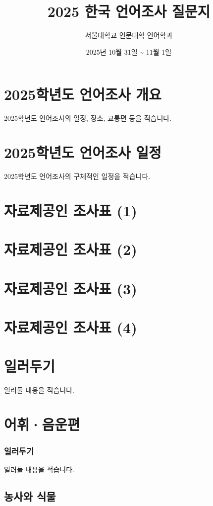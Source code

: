 \documentclass{snu-fl-questionnaire}
\title{2025 한국 언어조사 질문지}
\author{서울대학교 인문대학 언어학과}
\date{2025년 10월 31일 \textasciitilde{} 11월 1일}
\begin{document}
\frontmatter
\maketitle
\tableofcontents

\chapter{2025학년도 언어조사 개요}
2025학년도 언어조사의 일정, 장소, 교통편 등을 적습니다.

\chapter{2025학년도 언어조사 일정}
2025학년도 언어조사의 구체적인 일정을 적습니다.

\chapter{자료제공인 조사표 (1)}
\Consultant

\chapter{자료제공인 조사표 (2)}
\Consultant

\chapter{자료제공인 조사표 (3)}
\Consultant

\chapter{자료제공인 조사표 (4)}
\Consultant

\chapter{일러두기}
일러둘 내용을 적습니다.


\mainmatter
\chapter{어휘·음운편}
\subsection{일러두기}
일러둘 내용을 적습니다.

\section{농사와 식물}
\end{document}
